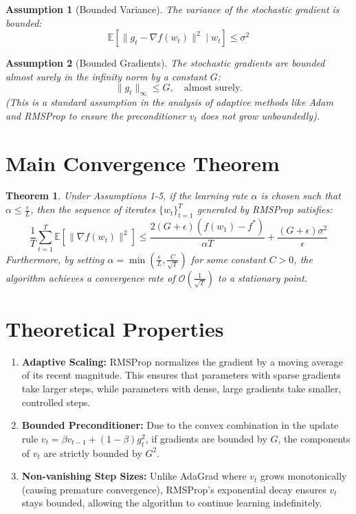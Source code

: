 \documentclass[11pt]{article}
\newtheorem{theorem}{Theorem}
\newtheorem{assumption}{Assumption}
\begin{document}
\begin{assumption}[Bounded Variance]
The variance of the stochastic gradient is bounded:
\begin{equation*}
    \mathbb{E}[\|g_t - \nabla f(w_t)\|^2 \mid w_t] \leq \sigma^2
\end{equation*}
\end{assumption}

\begin{assumption}[Bounded Gradients]
The stochastic gradients are bounded almost surely in the infinity norm by a constant $G$:
\begin{equation*}
    \|g_t\|_\infty \leq G, \quad \text{almost surely.}
\end{equation*}
(This is a standard assumption in the analysis of adaptive methods like Adam and RMSProp to ensure the preconditioner $v_t$ does not grow unboundedly).
\end{assumption}

\section*{Main Convergence Theorem}
\begin{theorem}
Under Assumptions 1-5, if the learning rate $\alpha$ is chosen such that $\alpha \leq \frac{\epsilon}{L}$, then the sequence of iterates $\{w_t\}_{t=1}^T$ generated by RMSProp satisfies:
\begin{equation*}
    \frac{1}{T} \sum_{t=1}^T \mathbb{E}[\|\nabla f(w_t)\|^2] \leq \frac{2(G + \epsilon)(f(w_1) - f^*)}{\alpha T} + \frac{(G + \epsilon)\sigma^2}{\epsilon}
\end{equation*}
Furthermore, by setting $\alpha = \min\left(\frac{\epsilon}{L}, \frac{C}{\sqrt{T}}\right)$ for some constant $C > 0$, the algorithm achieves a convergence rate of $\mathcal{O}\left(\frac{1}{\sqrt{T}}\right)$ to a stationary point.
\end{theorem}

\section*{Theoretical Properties}
\begin{enumerate}
    \item \textbf{Adaptive Scaling:} RMSProp normalizes the gradient by a moving average of its recent magnitude. This ensures that parameters with sparse gradients take larger steps, while parameters with dense, large gradients take smaller, controlled steps.
    \item \textbf{Bounded Preconditioner:} Due to the convex combination in the update rule $v_t = \beta v_{t-1} + (1-\beta)g_t^2$, if gradients are bounded by $G$, the components of $v_t$ are strictly bounded by $G^2$.
    \item \textbf{Non-vanishing Step Sizes:} Unlike AdaGrad where $v_t$ grows monotonically (causing premature convergence), RMSProp's exponential decay ensures $v_t$ stays bounded, allowing the algorithm to continue learning indefinitely.
\end{enumerate}
\end{document}
